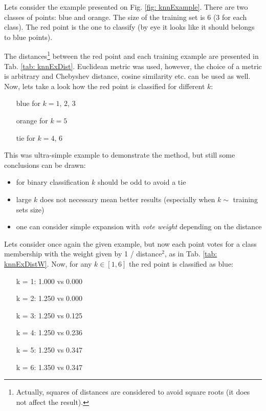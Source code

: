 Lets consider the example presented on Fig. \ref{fig: knnExample}. There are two classes of points: blue and orange. The size of the training set is 6 (3 for each class). The red point is the one to classify (by eye it looks like it should belongs to blue points).

The distances\footnote{Actually, squares of distances are considered to avoid square roots (it does not affect the result).} between the red point and each training example are presented in Tab. \ref{tab: knnExDist}. Euclidean metric was used, however, the choice of a metric is arbitrary and Chebyshev distance, cosine similarity etc. can be used as well. Now, lets take a look how the red point is classified for different $k$:

\begin{itemize}[leftmargin = 100pt]
 \item[\color{blue}blue] for $k = 1$, $2$, $3$
 \item[\color{orange}orange] for $k = 5$
 \item[\color{red}tie] for $k = 4$, $6$
\end{itemize}

This was ultra-simple example to demonstrate the method, but still some conclusions can be drawn:

\begin{itemize}
  \item for binary classification $k$ should be odd to avoid a tie
  \item large $k$ does not necessary mean better results (especially when $k \sim$ training sets size)
  \item one can consider simple expansion with {\it vote weight} depending on the distance
\end{itemize}

Lets consider once again the given example, but now each point votes for a class membership with the weight given by 1 / distance$^2$, as in Tab. \ref{tab: knnExDistW}. Now, for any $k \in [1,6]$ the red point is classified as blue:

\begin{itemize}[leftmargin = 100pt]
 \item[k = 1:] {\color{blue}1.000} vs {\color{orange}0.000} 
 \item[k = 2:] {\color{blue}1.250} vs {\color{orange}0.000} 
 \item[k = 3:] {\color{blue}1.250} vs {\color{orange}0.125} 
 \item[k = 4:] {\color{blue}1.250} vs {\color{orange}0.236} 
 \item[k = 5:] {\color{blue}1.250} vs {\color{orange}0.347} 
 \item[k = 6:] {\color{blue}1.350} vs {\color{orange}0.347} 
\end{itemize}

